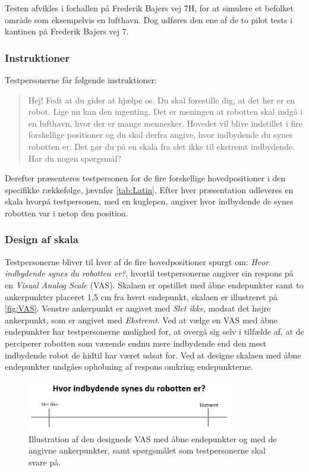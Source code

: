 \noindent
%
Testen afvikles i forhallen på Frederik Bajers vej 7H, for at simulere et befolket område som eksempelvis en lufthavn. Dog udføres den ene af de to pilot tests i kantinen på Frederik Bajers vej 7.
%
\subsubsection*{Instruktioner}
\label{Instruktioner}
%
Testpersonerne får følgende instruktioner: 
%
\begin{quotation}
\noindent
Hej!\blankline
%
Fedt at du gider at hjælpe os. Du skal forestille dig, at det her er en robot. Lige nu kan den ingenting. Det er meningen at robotten skal indgå i en lufthavn, hvor der er mange mennesker. Hovedet vil blive indstillet i fire forskellige positioner og du skal derfra angive, hvor indbydende du synes robotten er. Det gør du på en skala fra slet ikke til ekstremt indbydende.\blankline
%
Har du nogen spørgsmål?
\end{quotation}
%
Derefter præsenteres testpersonen for de fire forskellige hovedpositioner i den specifikke rækkefølge, jævnfør \autoref{tab:Latin}. Efter hver præsentation udleveres en skala hvorpå testpersonen, med en kuglepen, angiver hvor indbydende de synes robotten var i netop den position.  
%

\subsubsection*{Design af skala}
%
Testpersonerne bliver til hver af de fire hovedpositioner spurgt om: \textit{Hvor indbydende synes du robotten er?}, hvortil testpersonerne angiver sin respons på en \textit{Visual Analog Scale} (VAS). Skalaen er opstillet med åbne endepunkter samt to ankerpunkter placeret 1,5 cm fra hvert endepunkt, skalaen er illustreret på \autoref{fig:VAS}. Venstre ankerpunkt er angivet med \textit{Slet ikke}, modsat det højre ankerpunkt, som er angivet med \textit{Ekstremt}. Ved at vælge en VAS med åbne endepunkter har testpersonerne mulighed for, at overgå sig selv i tilfælde af, at de perciperer robotten som værende endnu mere indbydende end den mest indbydende robot de hidtil har været udsat for. Ved at designe skalaen med åbne endepunkter undgåes ophobning af respons omkring endepunkterne. 
%
\begin{figure}[H]
\centering
\includegraphics[width = 0.8\textwidth]{Figure/VAS.PNG} 
\caption{Illustration af den designede VAS med åbne endepunkter og med de angivne ankerpunkter, samt spørgsmålet som testpersonerne skal svare på.}
\label{fig:VAS}
\end{figure}
\noindent 
%
